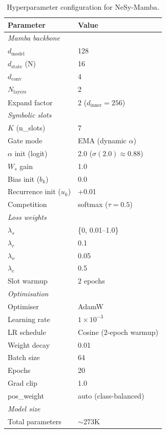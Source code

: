 \documentclass[conference]{IEEEtran}
\DeclareRobustCommand{\model}{NeSy-Mamba}
\begin{document}
\begin{table}[t]
\centering
\small
\caption{Hyperparameter configuration for \model{}.}
\label{tab:hyperparams}
\begin{tabular}{@{}ll@{}}
\toprule
\textbf{Parameter} & \textbf{Value} \\
\midrule
\multicolumn{2}{l}{\textit{Mamba backbone}} \\
$d_\text{model}$ & 128 \\
$d_\text{state}$ (N) & 16 \\
$d_\text{conv}$ & 4 \\
$N_\text{layers}$ & 2 \\
Expand factor & 2 ($d_\text{inner} = 256$) \\
\midrule
\multicolumn{2}{l}{\textit{Symbolic slots}} \\
$K$ (n\_slots) & 7 \\
Gate mode & EMA (dynamic $\alpha$) \\
$\alpha$ init (logit) & 2.0 ($\sigma(2.0) \approx 0.88$) \\
$W_s$ gain & 1.0 \\
Bias init ($b_k$) & 0.0 \\
Recurrence init ($u_k$) & +0.01 \\
Competition & softmax ($\tau = 0.5$) \\
\midrule
\multicolumn{2}{l}{\textit{Loss weights}} \\
$\lambda_s$ & \{0, 0.01--1.0\} \\
$\lambda_r$ & 0.1 \\
$\lambda_o$ & 0.05 \\
$\lambda_e$ & 0.5 \\
Slot warmup & 2 epochs \\
\midrule
\multicolumn{2}{l}{\textit{Optimisation}} \\
Optimiser & AdamW \\
Learning rate & $1 \times 10^{-3}$ \\
LR schedule & Cosine (2-epoch warmup) \\
Weight decay & 0.01 \\
Batch size & 64 \\
Epochs & 20 \\
Grad clip & 1.0 \\
pos\_weight & auto (class-balanced) \\
\midrule
\multicolumn{2}{l}{\textit{Model size}} \\
Total parameters & $\sim$273K \\
\bottomrule
\end{tabular}
\end{table}
\end{document}
